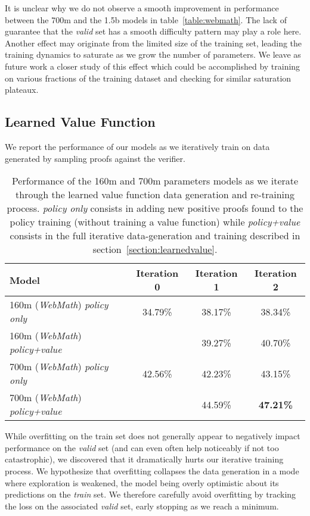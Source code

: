 \documentclass{article}
\begin{document}
It is unclear why we do not observe a smooth improvement in performance between the 700m and the 1.5b models in table~\ref{table:webmath}. The lack of guarantee that the \textit{valid} set has a smooth difficulty pattern may play a role here. Another effect may originate from the limited size of the training set, leading the training dynamics to saturate as we grow the number of parameters. We leave as future work a closer study of this effect which could be accomplished by training on various fractions of the training dataset and checking for similar saturation plateaux.

\subsection{Learned Value Function}

We report the performance of our models as we iteratively train on data generated by sampling proofs against the verifier.

\begin{table}[ht]
\caption{Performance of the 160m and 700m parameters models as we iterate through the learned value function data generation and re-training process. \textit{policy only} consists in adding new positive proofs found to the policy training (without training a value function) while \textit{policy+value} consists in the full iterative data-generation and training described in section~\ref{section:learnedvalue}.} 
\centering
\begin{tabular}{ |l|c|c|c| }
    \hline
    Model & Iteration 0 & Iteration 1 & Iteration 2 \\
    \hline
    160m (\textit{WebMath}) \textit{policy only} & 34.79\% & 38.17\% & 38.34\% \\
    160m (\textit{WebMath}) \textit{policy+value} & & 39.27\% & 40.70\% \\
    700m (\textit{WebMath}) \textit{policy only} & 42.56\% & 42.23\% & 43.15\% \\
    700m (\textit{WebMath}) \textit{policy+value} & & 44.59\% & \textbf{47.21\%} \\
    \hline
\end{tabular}
\label{table:value}
\end{table}


While overfitting on the train set does not generally appear to negatively impact performance on the \textit{valid} set (and can even often help noticeably if not too catastrophic), we discovered that it dramatically hurts our iterative training process. We hypothesize that overfitting collapses the data generation in a mode where exploration is weakened, the model being overly optimistic about its predictions on the \textit{train} set. We therefore carefully avoid overfitting by tracking the loss on the associated \textit{valid} set, early stopping as we reach a minimum.
\end{document}

